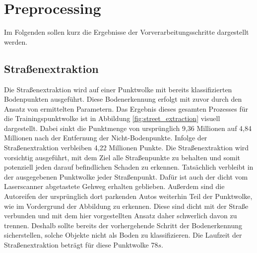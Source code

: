 \section{Preprocessing} 

Im Folgenden sollen kurz die Ergebnisse der Vorverarbeitungsschritte dargestellt werden.

\subsection*{Straßenextraktion}

Die Straßenextraktion wird auf einer Punktwolke mit bereits klassifizierten Bodenpunkten ausgeführt. Diese Bodenerkennung erfolgt mit zuvor durch den Ansatz von \cite{Mattes-2021} ermittelten Parametern. Das Ergebnis dieses gesamten Prozesses für die Trainingspunktwolke ist in Abbildung \ref{fig:street_extraction} visuell dargestellt. Dabei sinkt die Punktmenge von ursprünglich 9,36 Millionen auf 4,84 Millionen nach der Entfernung der Nicht-Bodenpunkte. Infolge der Straßenextraktion verbleiben 4,22 Millionen Punkte. Die Straßenextraktion wird vorsichtig ausgeführt, mit dem Ziel alle Straßenpunkte zu behalten und somit potenziell jeden darauf befindlichen Schaden zu erkennen. Tatsächlich verbleibt in der ausgegebenen Punktwolke jeder Straßenpunkt. Dafür ist auch der dicht vom Laserscanner abgetastete Gehweg erhalten geblieben. Außerdem sind die Autoreifen der ursprünglich dort parkenden Autos weiterhin Teil der Punktwolke, wie im Vordergrund der Abbildung zu erkennen. Diese sind dicht mit der Straße verbunden und mit dem hier vorgestellten Ansatz daher schwerlich davon zu trennen. Deshalb sollte bereits der vorhergehende Schritt der Bodenerkennung sicherstellen, solche Objekte nicht als Boden zu klassifizieren. Die Laufzeit der Straßenextraktion beträgt für diese Punktwolke 78$s$.

